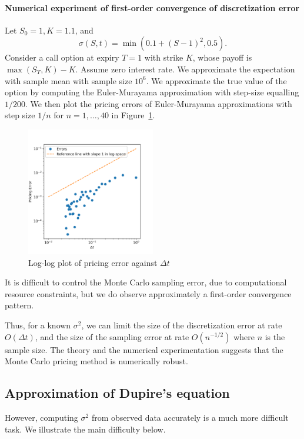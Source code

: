 \documentclass[12pt]{article}
\numberwithin{equation}{section}
\newcommand{\pr}[1]{\left(#1\right)}
\begin{document}
\paragraph{Numerical experiment of first-order convergence of discretization error} Let $S_0 = 1, K = 1.1$, and \[\sigma(S, t) = \min\pr{0.1 + (S - 1)^2, 0.5}.\] Consider a call option at expiry $T = 1$ with strike $K$, whose payoff is $\max(S_T, K) - K$. Assume zero interest rate. We approximate the expectation with sample mean with sample size $10^6$. We approximate the true value of the option by computing the Euler-Murayama approximation with step-size equalling $1/200$. We then plot the pricing errors of Euler-Murayama approximations with step size $1/n$ for $n=1,\ldots,40$ in Figure~\ref{fig:log-log}. 
\begin{figure}[h!]
    \centering
    \includegraphics[width=0.5\textwidth]{figs/montecarlo_discrete.png}
    \caption{Log-log plot of pricing error against $\Delta t$}
    \label{fig:log-log}
\end{figure}
It is difficult to control the Monte Carlo sampling error, due to computational resource constraints, but we do observe approximately a first-order convergence pattern. 


Thus, for a known $\sigma^2$, we can limit the size of the discretization error at rate $O(\Delta t)$, and the size of the sampling error at rate $O(n^{-1/2})$ where $n$ is the sample size. The theory and the numerical experimentation suggests that the Monte Carlo pricing method is numerically robust. 
\subsection{Approximation of Dupire's equation}
However, computing $\sigma^2$ from observed data accurately is a much more difficult task. We illustrate the main difficulty below.
\end{document}
